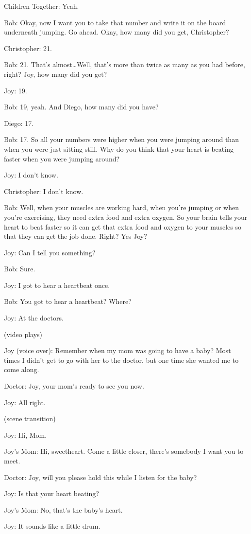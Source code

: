 Children Together: Yeah.

Bob: Okay, now I want you to take that number and write it on the board underneath jumping. Go ahead. Okay, how many did you get, Christopher?

Christopher: 21.

Bob: 21. That's almost\dots Well, that's more than twice as many as you had before, right? Joy, how many did you get?

Joy: 19.

Bob: 19, yeah. And Diego, how many did you have?

Diego: 17.

Bob: 17. So all your numbers were higher when you were jumping around than when you were just sitting still. Why do you think that your heart is beating faster when you were jumping around?

Joy: I don't know.

Christopher: I don't know.

Bob: Well, when your muscles are working hard, when you're jumping or when you're exercising, they need extra food and extra oxygen. So your brain tells your heart to beat faster so it can get that extra food and oxygen to your muscles so that they can get the job done. Right? Yes Joy?

Joy: Can I tell you something?

Bob: Sure.

Joy: I got to hear a heartbeat once.

Bob: You got to hear a heartbeat? Where?

Joy: At the doctors.

(video plays)

Joy (voice over): Remember when my mom was going to have a baby? Most times I didn't get to go with her to the doctor, but one time she wanted me to come along.

Doctor: Joy, your mom's ready to see you now.

Joy: All right.

(scene transition)

Joy: Hi, Mom.

Joy's Mom: Hi, sweetheart. Come a little closer, there's somebody I want you to meet.

Doctor: Joy, will you please hold this while I listen for the baby?

Joy: Is that your heart beating?

Joy's Mom: No, that's the baby's heart.

Joy: It sounds like a little drum.

